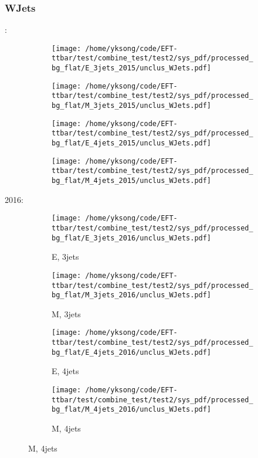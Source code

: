 \documentclass{beamer}
\begin{document}
\begin{frame}
\frametitle{WJets}
\fontsize{5}{1}:
\begin{figure}
\centering
\begin{subfigure}[b]{0.24\textwidth}
\texttt{[image: /home/yksong/code/EFT-ttbar/test/combine\_test/test2/sys\_pdf/processed\_bg\_flat/E\_3jets\_2015/unclus\_WJets.pdf]}
\end{subfigure}
\begin{subfigure}[b]{0.24\textwidth}
\texttt{[image: /home/yksong/code/EFT-ttbar/test/combine\_test/test2/sys\_pdf/processed\_bg\_flat/M\_3jets\_2015/unclus\_WJets.pdf]}
\end{subfigure}
\begin{subfigure}[b]{0.24\textwidth}
\texttt{[image: /home/yksong/code/EFT-ttbar/test/combine\_test/test2/sys\_pdf/processed\_bg\_flat/E\_4jets\_2015/unclus\_WJets.pdf]}
\end{subfigure}
\begin{subfigure}[b]{0.24\textwidth}
\texttt{[image: /home/yksong/code/EFT-ttbar/test/combine\_test/test2/sys\_pdf/processed\_bg\_flat/M\_4jets\_2015/unclus\_WJets.pdf]}
\end{subfigure}
\end{figure}
2016:
\begin{figure}
\centering
\begin{subfigure}[b]{0.24\textwidth}
\texttt{[image: /home/yksong/code/EFT-ttbar/test/combine\_test/test2/sys\_pdf/processed\_bg\_flat/E\_3jets\_2016/unclus\_WJets.pdf]}
\captionsetup{font=tiny}
\caption{E, 3jets}
\end{subfigure}
\begin{subfigure}[b]{0.24\textwidth}
\texttt{[image: /home/yksong/code/EFT-ttbar/test/combine\_test/test2/sys\_pdf/processed\_bg\_flat/M\_3jets\_2016/unclus\_WJets.pdf]}
\captionsetup{font=tiny}
\caption{M, 3jets}
\end{subfigure}
\begin{subfigure}[b]{0.24\textwidth}
\texttt{[image: /home/yksong/code/EFT-ttbar/test/combine\_test/test2/sys\_pdf/processed\_bg\_flat/E\_4jets\_2016/unclus\_WJets.pdf]}
\captionsetup{font=tiny}
\caption{E, 4jets}
\end{subfigure}
\begin{subfigure}[b]{0.24\textwidth}
\texttt{[image: /home/yksong/code/EFT-ttbar/test/combine\_test/test2/sys\_pdf/processed\_bg\_flat/M\_4jets\_2016/unclus\_WJets.pdf]}
\captionsetup{font=tiny}
\caption{M, 4jets}
\end{subfigure}
\end{figure}
\end{frame}
\end{document}
